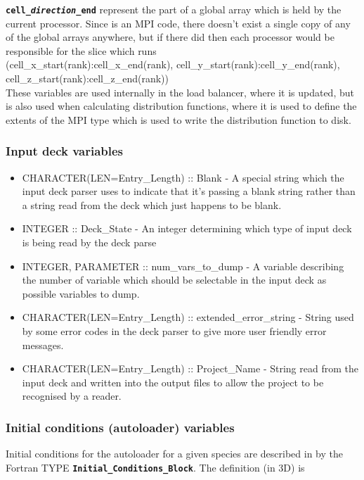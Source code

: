 \documentclass[12pt,a4paper]{article}
\newcommand{\inlinecode}[1]{{\color{warwickred} \bf\texttt{#1}}}
\newcommand{\EPOCH}{{\color{warwickdark}\fontfamily{phv}\selectfont{EPOCH}}}
\begin{document}
\inlinecode{cell\_{\it direction}\_end} represent the part of a global array
which is held by the current processor. Since {\EPOCH} is an MPI code, there
doesn't exist a single copy of any of the global arrays anywhere, but if there
did then each processor would be responsible for the slice which runs\\
(cell\_x\_start(rank):cell\_x\_end(rank),
cell\_y\_start(rank):cell\_y\_end(rank),
cell\_z\_start(rank):cell\_z\_end(rank))\\
These variables are used internally in the load balancer, where it is updated,
but is also used when calculating distribution functions, where it is used to
define the extents of the MPI type which is used to write the distribution
function to disk.

\subsubsection{Input deck variables}
\begin{itemize}
\item CHARACTER(LEN=Entry\_Length) :: Blank - A special string which the input
  deck parser uses to indicate that it's passing a blank string rather than a
  string read from the deck which just happens to be blank.
\item INTEGER :: Deck\_State - An integer determining which type of input deck
  is being read by the deck parse
\item INTEGER, PARAMETER :: num\_vars\_to\_dump - A variable describing the
  number of variable which should be selectable in the input deck as possible
  variables to dump.
\item CHARACTER(LEN=Entry\_Length) :: extended\_error\_string - String used by
  some error codes in the deck parser to give more user friendly error
  messages.
\item CHARACTER(LEN=Entry\_Length) :: Project\_Name - String read from the
  input deck and written into the output files to allow the project to be
  recognised by a reader.
\end{itemize}

\subsubsection{Initial conditions (autoloader) variables}
Initial conditions for the autoloader for a given species are described in
{\EPOCH} by the Fortran TYPE \inlinecode{Initial\_Conditions\_Block}. The
definition (in 3D) is
\end{document}
